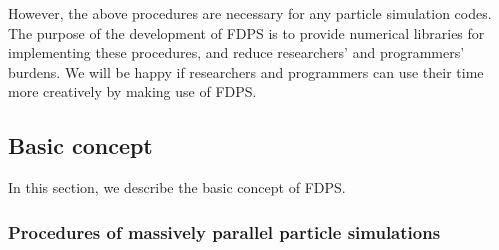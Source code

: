 However, the above procedures are necessary for any particle
simulation codes. The purpose of the development of FDPS is to provide
numerical libraries for implementing these procedures, and reduce
researchers' and programmers' burdens. We will be happy if researchers
and programmers can use their time more creatively by making use of
FDPS.

\subsection{Basic concept}

In this section, we describe the basic concept of FDPS.

\subsubsection{Procedures of massively parallel particle simulations}
\label{sec:overview_concept_abstraktion}

